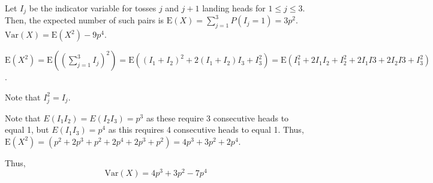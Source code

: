 Let $I_{j}$ be the indicator variable for tosses $j$ and $j+1$ landing heads for
$1 \leq j \leq 3$. Then, the expected number of such pairs is $\text{E}(X) =
\sum_{j=1}^{3}P(I_{j}=1) = 3p^{2}$. $\text{Var}(X) = \text{E}(X^{2}) -
9p^{4}$.

$\text{E}(X^{2}) = \text{E}((\sum_{j=1}^{3}I_{j})^{2}) = \text{E}((I_{1} + I_
{2})^{2} + 2(I_{1}+I_{2})I_{3} + I_{3}^{2}) = \text{E}(I_{1}^{2} + 2I_{1}I_{2}
+ I_{2}^{2} + 2I_{1}I{3} + 2I_{2}I{3} + I_{3}^{2})$. 

Note that $I_{j}^{2} = I_
{j}$. 

Note that $E(I_{1}I_{2})=E(I_{2}I_{3})=p^{3}$ as these require 3 consecutive heads to equal 1, but $E(I_{1}I_{3}) = p^{4}$ as this requires 4 consecutive heads to equal 1. Thus, $\text{E}(X^{2}) = (p^{2} + 2p^{3} + p^{2} + 2p^{4} + 2p^{3} + p^
{2}) = 4p^{3} + 3p^{2} + 2p^{4}$.

Thus, $$\text{Var}(X)= 4p^{3} + 3p^{2} - 7p^{4}$$
